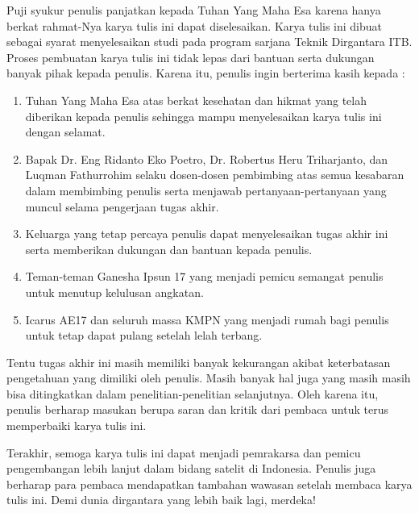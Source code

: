 Puji syukur penulis panjatkan kepada Tuhan Yang Maha Esa karena hanya berkat
rahmat-Nya karya tulis ini dapat diselesaikan. Karya tulis ini dibuat sebagai
syarat menyelesaikan studi pada program sarjana Teknik Dirgantara ITB. Proses
pembuatan karya tulis ini tidak lepas dari bantuan serta dukungan banyak pihak
kepada penulis. Karena itu, penulis ingin berterima kasih kepada :

\begin{enumerate}
\item Tuhan Yang Maha Esa atas berkat kesehatan dan hikmat yang telah diberikan kepada penulis sehingga mampu menyelesaikan karya tulis ini dengan selamat.
\item Bapak Dr. Eng Ridanto Eko Poetro, Dr. Robertus Heru Triharjanto, dan Luqman Fathurrohim selaku dosen-dosen pembimbing atas semua kesabaran dalam membimbing penulis serta menjawab pertanyaan-pertanyaan yang muncul selama pengerjaan tugas akhir.
\item Keluarga yang tetap percaya penulis dapat menyelesaikan tugas akhir ini serta memberikan dukungan dan bantuan kepada penulis.
\item Teman-teman Ganesha Ipsun 17 yang menjadi pemicu semangat penulis untuk menutup kelulusan angkatan. 
\item Icarus AE17 dan seluruh massa KMPN yang menjadi rumah bagi penulis untuk tetap dapat pulang setelah lelah terbang.
\end{enumerate}

Tentu tugas akhir ini masih memiliki banyak kekurangan akibat keterbatasan
pengetahuan yang dimiliki oleh penulis. Masih banyak hal juga yang masih masih
bisa ditingkatkan dalam penelitian-penelitian selanjutnya. Oleh karena itu,
penulis berharap masukan berupa saran dan kritik dari pembaca untuk terus
memperbaiki karya tulis ini.

Terakhir, semoga karya tulis ini dapat menjadi pemrakarsa dan pemicu
pengembangan lebih lanjut dalam bidang satelit di Indonesia. Penulis juga
berharap para pembaca mendapatkan tambahan wawasan setelah membaca karya tulis
ini. Demi dunia dirgantara yang lebih baik lagi, merdeka!
